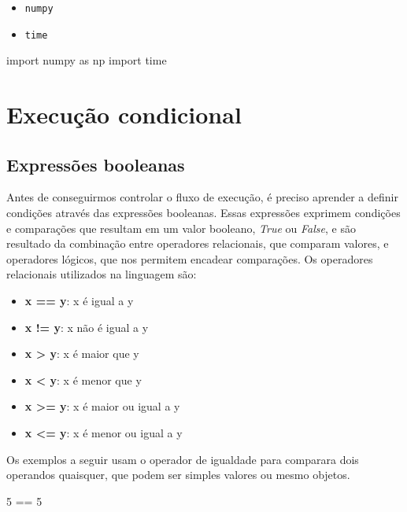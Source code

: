 \documentclass[
  brazilian,
  letterpaper,
  DIV=11,
  numbers=noendperiod]{scrreprt}
\newenvironment{Shaded}{\begin{snugshade}}{\end{snugshade}}
\newcommand{\DecValTok}[1]{\textcolor[rgb]{0.68,0.00,0.00}{#1}}
\newcommand{\ImportTok}[1]{\textcolor[rgb]{0.00,0.46,0.62}{#1}}
\newcommand{\NormalTok}[1]{\textcolor[rgb]{0.00,0.23,0.31}{#1}}
\newcommand{\OperatorTok}[1]{\textcolor[rgb]{0.37,0.37,0.37}{#1}}
\providecommand{\tightlist}{%
  \setlength{\itemsep}{0pt}\setlength{\parskip}{0pt}}
\begin{document}
\begin{itemize}
\tightlist
\item
  \texttt{numpy}
\item
  \texttt{time}
\end{itemize}

\begin{Shaded}
\begin{Highlighting}[]
\ImportTok{import}\NormalTok{ numpy }\ImportTok{as}\NormalTok{ np}
\ImportTok{import}\NormalTok{ time }
\end{Highlighting}
\end{Shaded}

\section{Execução condicional}\label{execuuxe7uxe3o-condicional}

\subsection{Expressões booleanas}\label{expressuxf5es-booleanas}

Antes de conseguirmos controlar o fluxo de execução, é preciso aprender
a definir condições através das expressões booleanas. Essas expressões
exprimem condições e comparações que resultam em um valor booleano,
\emph{True} ou \emph{False}, e são resultado da combinação entre
operadores relacionais, que comparam valores, e operadores lógicos, que
nos permitem encadear comparações. Os operadores relacionais utilizados
na linguagem são:

\begin{itemize}
\tightlist
\item
  \textbf{x == y}: x é igual a y
\item
  \textbf{x != y}: x não é igual a y
\item
  \textbf{x \textgreater{} y}: x é maior que y
\item
  \textbf{x \textless{} y}: x é menor que y
\item
  \textbf{x \textgreater= y}: x é maior ou igual a y
\item
  \textbf{x \textless= y}: x é menor ou igual a y
\end{itemize}

Os exemplos a seguir usam o operador de igualdade para comparara dois
operandos quaisquer, que podem ser simples valores ou mesmo objetos.

\begin{Shaded}
\begin{Highlighting}[]
\DecValTok{5} \OperatorTok{==} \DecValTok{5}
\end{Highlighting}
\end{Shaded}
\end{document}
